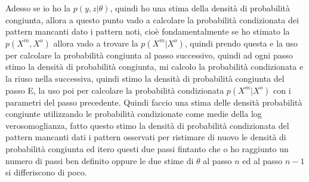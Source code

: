 \noindent Adesso se io ho la $p(y,z|\theta)$, quindi ho una stima della densità di probabilità congiunta, allora a questo punto vado a calcolare la probabilità condizionata dei pattern mancanti dato i pattern noti, cioè fondamentalmente se ho stimato la $p(X^m, X^o)$  allora vado a trovare la $p(X^m | X^o)$, quindi prendo questa e la uso per calcolare la probabilità congiunta al passo successivo, quindi ad ogni passo stimo la densità di probabilità congiunta, mi calcolo la probabilità condizionata e la riuso nella successiva, quindi stimo la densità di probabilità congiunta del passo E, la uso poi per calcolare la probabilità condizionata $p(X^m|X^o)$ con i parametri del passo precedente. Quindi faccio una stima delle densità probabilità congiunte utilizzando le probabilità condizionate come medie della log verosomoglianza, fatto questo stimo la densità di probabilità condizionata del pattern mancanti dati i pattern osservati per ristimare di nuovo le densità di probabilità congiunta ed itero questi due passi fintanto che o ho raggiunto un numero di passi ben definito oppure le due stime di $\theta$ al passo $n$ ed al passo $n-1$ si differiscono di poco.

%
